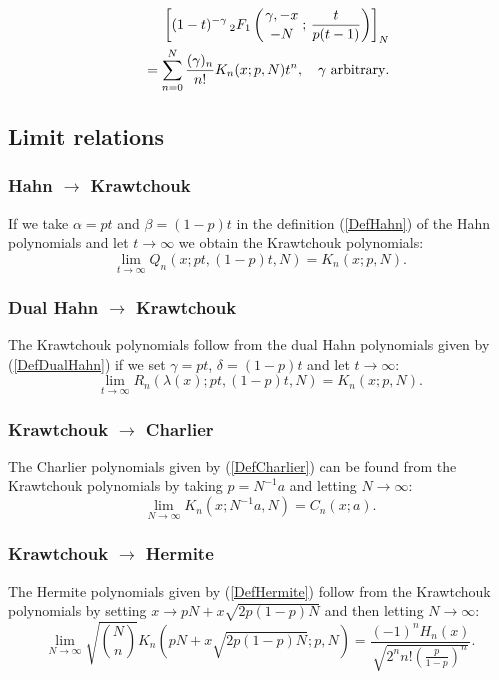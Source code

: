 \documentclass[envcountchap,graybox]{svmono}
\newcounter{rom}
\newcommand{\hyp}[5]{\mbox{}_{#1}{F}_{#2}
\left(\genfrac{}{}{0pt}{}{#3}{#4}\,;\,#5\right)}
\begin{document}
\begin{eqnarray}
\label{GenKrawtchouk3}
& &\left[(1-t)^{-\gamma}\,\hyp{2}{1}{\gamma,-x}{-N}{\frac{t}{p(t-1)}}\right]_N\nonumber\\
& &{}=\sum_{n=0}^N\frac{(\gamma)_n}{n!}K_n(x;p,N)t^n,
\quad\textrm{$\gamma$ arbitrary}.
\end{eqnarray}

\subsection*{Limit relations}

\subsubsection*{Hahn $\rightarrow$ Krawtchouk}
If we take $\alpha=pt$ and $\beta=(1-p)t$ in the definition (\ref{DefHahn}) of the Hahn
polynomials and let $t\rightarrow\infty$ we obtain the Krawtchouk polynomials:
$$\lim_{t\rightarrow\infty}Q_n(x;pt,(1-p)t,N)=K_n(x;p,N).$$

\subsubsection*{Dual Hahn $\rightarrow$ Krawtchouk}
The Krawtchouk polynomials follow from the dual Hahn polynomials given by
(\ref{DefDualHahn}) if we set $\gamma=pt$, $\delta=(1-p)t$ and let $t\rightarrow\infty$:
$$\lim_{t\rightarrow\infty}R_n(\lambda(x);pt,(1-p)t,N)=K_n(x;p,N).$$

\subsubsection*{Krawtchouk $\rightarrow$ Charlier}
The Charlier polynomials given by (\ref{DefCharlier}) can be found from the Krawtchouk
polynomials by taking $p=N^{-1}a$ and letting $N\rightarrow\infty$:
\begin{equation}
\lim_{N\rightarrow\infty}K_n(x;N^{-1}a,N)=C_n(x;a).
\end{equation}

\subsubsection*{Krawtchouk $\rightarrow$ Hermite}
The Hermite polynomials given by (\ref{DefHermite}) follow from the Krawtchouk polynomials
by setting $x\rightarrow pN+x\sqrt{2p(1-p)N}$ and then letting $N\rightarrow\infty$:
\begin{equation}
\lim_{N\rightarrow\infty}
\sqrt{\binom{N}{n}}K_n(pN+x\sqrt{2p(1-p)N};p,N)
=\frac{\displaystyle (-1)^nH_n(x)}{\displaystyle\sqrt{2^nn!\left(\frac{p}{1-p}\right)^n}}.
\end{equation}
\end{document}
